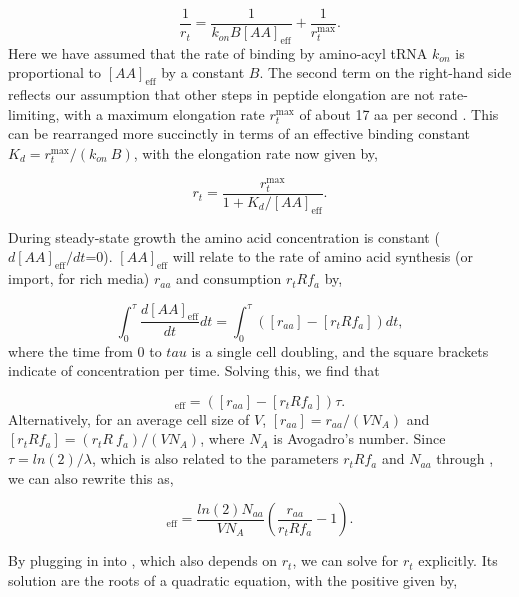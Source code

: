 \begin{equation}
\frac{1}{r_t} = \frac{1}{k_{on} B [AA]_{\text{eff}}} + \frac{1}{r_{t}^{\text{max}}}.
\end{equation}
Here we have assumed that the rate of binding by amino-acyl tRNA $k_{on}$ is
proportional to $[AA]_{\text{eff}}$ by a constant $B$. The second term on the
right-hand side reflects our assumption that other steps in peptide elongation
are not rate-limiting, with a maximum elongation rate $r_{t}^{\text{max}}$ of
about 17 aa per second \cite{dai2016}. This can be rearranged more succinctly in
terms of an effective binding constant $K_d = r_{t}^{\text{max}}/ (k_{on} \ B)$,
with the elongation rate now given by,

\begin{equation}
r_t = \frac{r_{t}^{\text{max}}}{1 + K_d/[AA]_{\text{eff}}}.
\label{eq:rt_kd_simple}
\end{equation}

During steady-state
growth the amino acid concentration is constant ($d[AA]_{\text{eff}}/dt$=0). $[AA]_{\text{eff}}$
will relate to the
rate of amino acid synthesis (or import, for rich media)
$r_{aa}$ and consumption $r_t R f_a$ by,

\begin{equation}
\int_{0}^{\tau} \frac{d[AA]_{\text{eff}}}{dt} dt =  \int_{0}^{\tau} ([r_{aa}] - [r_t R f_a]) dt,
\end{equation}
where the time from 0 to $tau$ is a single cell doubling, and the square
brackets indicate of concentration per time. Solving this, we find that

\begin{equation}
[AA]_{\text{eff}} =  ([r_{aa}] - [r_t R f_a]) \tau.
\end{equation}
Alternatively, for an average cell size of $V$,  $[r_{aa}] = r_{aa}/(V N_A)$
and $[r_t R f_a] = (r_t R \ f_a)/(V N_A)$, where $N_A$ is Avogadro's
number. Since $\tau = ln(2)/\lambda$, which is also related to the parameters
$r_t R f_a$ and $N_{aa}$ through , we
can also rewrite this as,

\begin{equation}
[AA]_{\text{eff}} = \frac{ln(2) N_{aa}}{V N_A} \left(\frac{r_{aa}}{r_t R f_a} - 1 \right) .
\label{eq:aa_final}
\end{equation}


By plugging in  into , which also depends on $r_t$, we
can solve for $r_t$ explicitly. Its solution are the roots of a quadratic equation,
with the positive given by,

